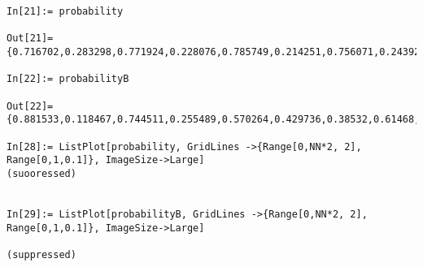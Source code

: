 \begin{lstlisting}
In[21]:= probability

Out[21]= {0.716702,0.283298,0.771924,0.228076,0.785749,0.214251,0.756071,0.243929,0.687408,0.312592,0.590214,0.409786,0.479286,0.520714,0.371512,0.628488,0.283298,0.716702,0.228076,0.771924,0.214251,0.785749,0.243929,0.756071,0.312592,0.687408,0.409786,0.590214,0.520714,0.479286,0.628488,0.371512,0.716702,0.283298,0.771924,0.228076,0.785749,0.214251,0.756071,0.243929,0.687408,0.312592,0.590214,0.409786,0.479286,0.520714,0.371512,0.628488,0.283298,0.716702,0.228076,0.771924,0.214251,0.785749,0.243929,0.756071,0.312592,0.687408,0.409786,0.590214,0.520714,0.479286,0.628488,0.371512}

In[22]:= probabilityB

Out[22]= {0.881533,0.118467,0.744511,0.255489,0.570264,0.429736,0.38532,0.61468,0.217835,0.782165,0.0933066,0.906693,0.0306941,0.969306,0.0395291,0.960471,0.118467,0.881533,0.255489,0.744511,0.429736,0.570264,0.61468,0.38532,0.782165,0.217835,0.906693,0.0933066,0.969306,0.0306941,0.960471,0.0395291,0.881533,0.118467,0.744511,0.255489,0.570264,0.429736,0.38532,0.61468,0.217835,0.782165,0.0933066,0.906693,0.0306941,0.969306,0.0395291,0.960471,0.118467,0.881533,0.255489,0.744511,0.429736,0.570264,0.61468,0.38532,0.782165,0.217835,0.906693,0.0933066,0.969306,0.0306941,0.960471,0.0395291}

In[28]:= ListPlot[probability, GridLines ->{Range[0,NN*2, 2], Range[0,1,0.1]}, ImageSize->Large]
(suooressed)


In[29]:= ListPlot[probabilityB, GridLines ->{Range[0,NN*2, 2], Range[0,1,0.1]}, ImageSize->Large]

(suppressed)

\end{lstlisting}